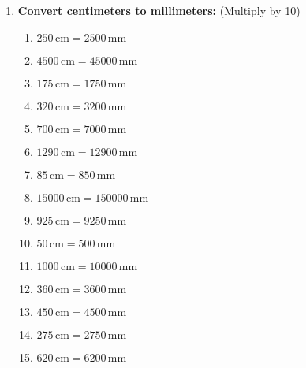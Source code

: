 \documentclass[12pt]{article}
\begin{document}
\begin{enumerate}
    \item \textbf{Convert centimeters to millimeters:}
    (Multiply by 10)
    \begin{multicols}{2}
    \begin{enumerate}
        \item \(250 \, \text{cm} = 2500 \, \text{mm}\)
        \item \(4500 \, \text{cm} = 45000 \, \text{mm}\)
        \item \(175 \, \text{cm} = 1750 \, \text{mm}\)
        \item \(320 \, \text{cm} = 3200 \, \text{mm}\)
        \item \(700 \, \text{cm} = 7000 \, \text{mm}\)
        \item \(1290 \, \text{cm} = 12900 \, \text{mm}\)
        \item \(85 \, \text{cm} = 850 \, \text{mm}\)
        \item \(15000 \, \text{cm} = 150000 \, \text{mm}\)
        \item \(925 \, \text{cm} = 9250 \, \text{mm}\)
        \item \(50 \, \text{cm} = 500 \, \text{mm}\)
        \item \(1000 \, \text{cm} = 10000 \, \text{mm}\)
        \item \(360 \, \text{cm} = 3600 \, \text{mm}\)
        \item \(450 \, \text{cm} = 4500 \, \text{mm}\)
        \item \(275 \, \text{cm} = 2750 \, \text{mm}\)
        \item \(620 \, \text{cm} = 6200 \, \text{mm}\)
    \end{enumerate}
    \end{multicols}
\end{enumerate}
\end{document}
